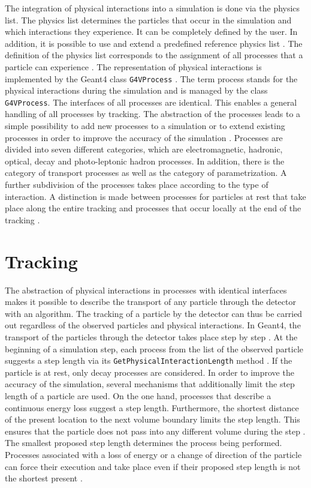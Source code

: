 \documentclass[12pt, a4paper]{thesis}
\begin{document}
The integration of physical interactions into a simulation is done via
the physics list. The physics list determines the particles that occur
in the simulation and which interactions they experience. It can be
completely defined by the user. In addition, it is possible to use and
extend a predefined reference physics list \cite{geant4-rec-dev}. The
definition of the physics list corresponds to the assignment of all
processes that a particle can experience
\cite{geant_simul_toolkit}. The representation of physical
interactions is implemented by the Geant4 class \texttt{G4VProcess}
\cite{geant_simul_toolkit}. The term process stands for the physical
interactions during the simulation and is managed by the class
\texttt{G4VProcess}. The interfaces of all processes are
identical. This enables a general handling of all processes by
tracking. The abstraction of the processes leads to a simple
possibility to add new processes to a simulation or to extend existing
processes in order to improve the accuracy of the simulation
\cite{geant4-doc}. Processes are divided into seven different
categories, which are electromagnetic, hadronic, optical, decay and
photo-leptonic hadron processes. In addition, there is the category of
transport processes as well as the category of parametrization. A
further subdivision of the processes takes place according to the type
of interaction. A distinction is made between processes for particles
at rest that take place along the entire tracking and processes that
occur locally at the end of the tracking \cite{geant_simul_toolkit}.

\clearpage
\section{Tracking}
\label{sec:org2ff4601}

The abstraction of physical interactions in processes with identical
interfaces makes it possible to describe the transport of any particle
through the detector with an algorithm. The tracking of a particle by
the detector can thus be carried out regardless of the observed
particles and physical interactions.  In Geant4, the transport of the
particles through the detector takes place step by step
\cite{geant_simul_toolkit}.  At the beginning of a simulation step, each
process from the list of the observed particle suggests a step length
via its \texttt{GetPhysicalInteractionLength} method
\cite{geant_simul_toolkit}. If the particle is at rest, only decay
processes are considered. In order to improve the accuracy of the
simulation, several mechanisms that additionally limit the step length
of a particle are used. On the one hand, processes that describe a
continuous energy loss suggest a step length. Furthermore, the
shortest distance of the present location to the next volume boundary
limits the step length.  This ensures that the particle does not pass
into any different volume during the step \cite{geant4-rec-dev}. The
smallest proposed step length determines the process being
performed. Processes associated with a loss of energy or a change of
direction of the particle can force their execution and take place
even if their proposed step length is not the shortest present
\cite{geant_simul_toolkit}.
\end{document}
